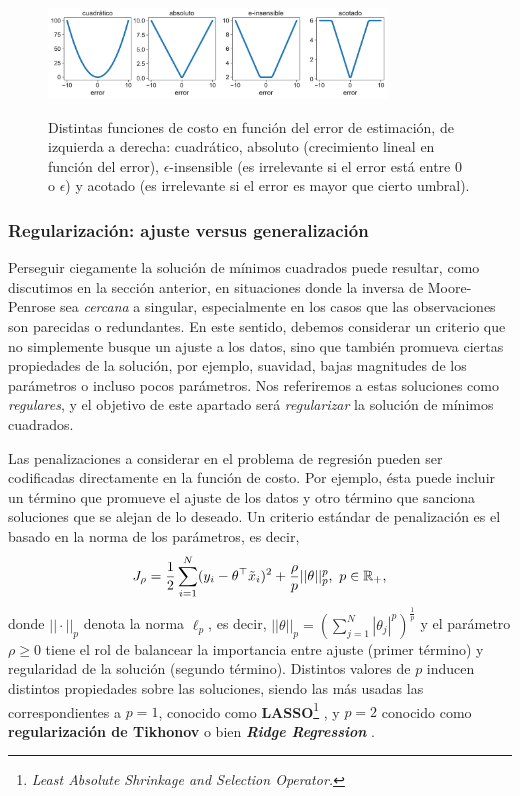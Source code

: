 \begin{figure}[H]
	\centering
	\includegraphics[width=0.8\textwidth]{img/cap1_errores.pdf}\\
	\caption{Distintas funciones de costo en función del error de estimación, de izquierda a derecha: cuadrático, absoluto (crecimiento lineal en función del error), $\epsilon$-insensible (es irrelevante si el error está entre 0 o  $\epsilon$) y acotado (es irrelevante si el error es mayor que cierto umbral).}
	\label{fig:reg_lin_err}  
\end{figure}


\subsubsection{Regularización: ajuste versus generalización} %
\label{sub:min_cuad_reg}

Perseguir ciegamente la solución de mínimos cuadrados puede resultar, como discutimos en la sección anterior, en situaciones donde la inversa de Moore-Penrose sea \emph{cercana} a singular, especialmente en los casos que las observaciones son parecidas o redundantes. En este sentido, debemos considerar un criterio que no simplemente busque un ajuste a los datos, sino que también promueva ciertas propiedades de la solución, por ejemplo, suavidad, bajas magnitudes de los parámetros o incluso pocos parámetros. Nos referiremos a estas soluciones como \emph{regulares}, y el objetivo de este apartado será \emph{regularizar} la solución de mínimos cuadrados.

Las penalizaciones a considerar en el problema de regresión pueden ser codificadas directamente en la función de costo. Por ejemplo, ésta puede incluir un término que promueve el ajuste de los datos y otro término que sanciona soluciones que se alejan de lo deseado. Un criterio estándar de penalización es el basado en la norma de los parámetros, es decir, 
\begin{equation}
	J_\rho = \frac{1}{2}\sum_{i=1}^N(y_i-\theta^
	\top \tilde{x}_i)^2 + \frac{\rho}{p}||\theta||_p^p,\ p\in{\mathbb R}_+,
	\label{eq:reg_least_squares}
\end{equation} 
donde $||\cdot||_p$ denota la norma $\ell_p$, es decir, $||\theta||_p=\left(\sum_{j=1}^N|\theta_j|^p\right)^\frac{1}{p}$ y el parámetro $\rho\geq0$ tiene el rol de balancear la importancia entre ajuste (primer término) y regularidad de la solución (segundo término). Distintos valores de $p$ inducen distintos propiedades sobre las soluciones, siendo las más usadas las correspondientes a $p=1$, conocido como \textbf{LASSO}\footnote{\emph{Least Absolute Shrinkage and Selection Operator.}} \cite{tibshirani_1996}, y $p=2$ conocido como \textbf{regularización de Tikhonov} \cite{tikhonov_arsenin_1977} o bien \textbf{\emph{Ridge Regression}} \cite{hoerl_kennard_1970}.  

